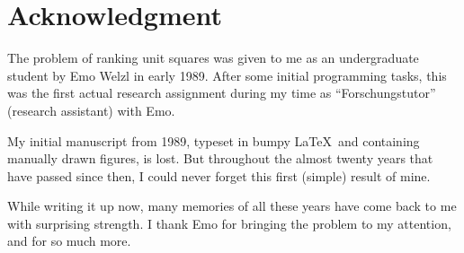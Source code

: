 \documentclass[fleqn,11pt]{article}
\begin{document}
\section*{Acknowledgment}
The problem of ranking unit squares was given to me as an
undergraduate student by Emo Welzl in early 1989.  After some initial
programming tasks, this was the first actual research assignment
during my time as ``Forschungstutor'' (research assistant) with Emo.

My initial manuscript from 1989, typeset in bumpy \LaTeX\ and
containing manually drawn figures, is lost. But throughout the almost
twenty years that have passed since then, I could never forget this
first (simple) result of mine. 

While writing it up now, many memories of all these years have come
back to me with surprising strength. I thank Emo for bringing the
problem to my attention, and for so much more.
 
\end{document}
